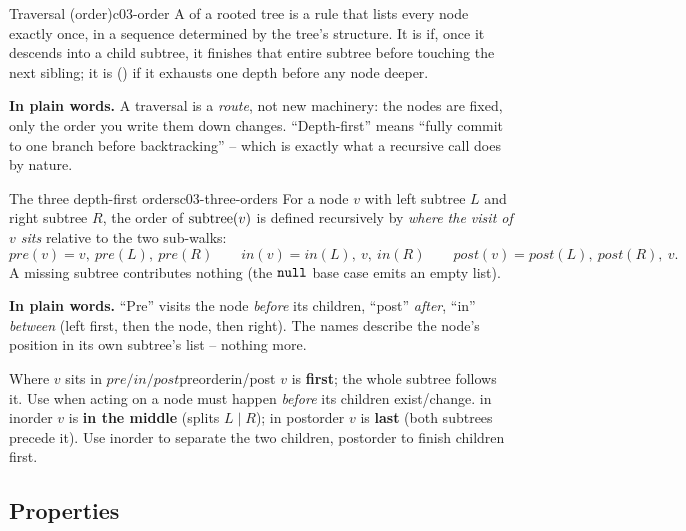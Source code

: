 \begin{definition}{Traversal (order)}{c03-order}
A  of a rooted tree is a rule that lists every node exactly once, in a
sequence determined by the tree's structure. It is  if, once it
descends into a child subtree, it finishes that entire subtree before touching the next
sibling; it is  () if it exhausts one depth before
any node deeper.
\end{definition}

\noindent\textbf{In plain words.} A traversal is a \emph{route}, not new machinery: the
nodes are fixed, only the order you write them down changes. ``Depth-first'' means
``fully commit to one branch before backtracking'' -- which is exactly what a recursive
call does by nature.

\begin{definition}{The three depth-first orders}{c03-three-orders}
For a node $v$ with left subtree $L$ and right subtree $R$, the order of $\operatorname{subtree}(v)$ is
defined recursively by \emph{where the visit of $v$ sits} relative to the two sub-walks:
\[
\mathit{pre}(v) = v,\ \mathit{pre}(L),\ \mathit{pre}(R)\qquad
\mathit{in}(v)  = \mathit{in}(L),\ v,\ \mathit{in}(R)\qquad
\mathit{post}(v)= \mathit{post}(L),\ \mathit{post}(R),\ v.
\]
A missing subtree contributes nothing (the $\texttt{null}$ base case emits an empty list).
\end{definition}

\noindent\textbf{In plain words.} ``Pre'' visits the node \emph{before} its children,
``post'' \emph{after}, ``in'' \emph{between} (left first, then the node, then right).
The names describe the node's position in its own subtree's list -- nothing more.

\begin{vsbox}{Where $v$ sits in $\mathit{pre}/\mathit{in}/\mathit{post}$}{preorder}{in/post}
{ $v$ is \textbf{first}; the whole subtree follows it. Use when acting on a node must
happen \emph{before} its children exist/change. }
{ in inorder $v$ is \textbf{in the middle} (splits $L\mid R$); in postorder $v$ is
\textbf{last} (both subtrees precede it). Use inorder to separate the two children,
postorder to finish children first. }
\end{vsbox}

\subsection{Properties}

